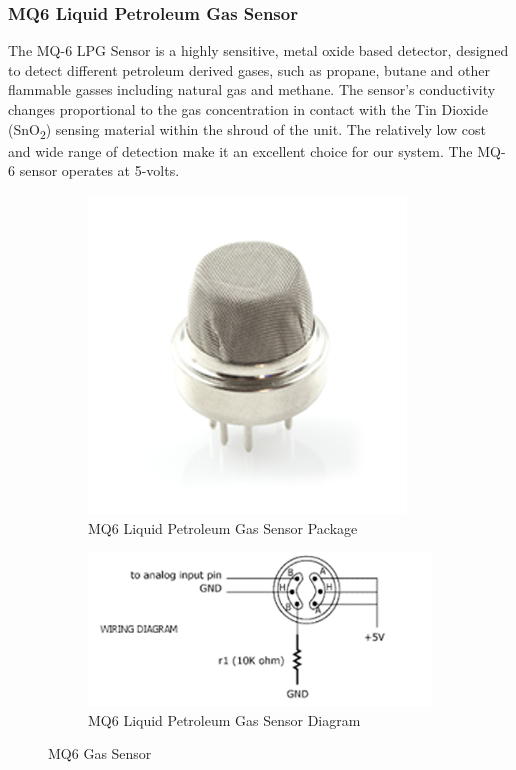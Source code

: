 \subsubsection{MQ6 Liquid Petroleum Gas Sensor}
\par The MQ-6 LPG Sensor is a highly sensitive, metal oxide based detector, designed to detect different petroleum derived gases, such as propane, butane and other flammable gasses including natural gas and methane. The sensor's conductivity changes proportional to the gas concentration in contact with the Tin Dioxide (SnO\textsubscript{2}) sensing material within the shroud of the unit. The relatively low cost and wide range of detection make it an excellent choice for our system. The MQ-6 sensor operates at 5-volts.
\begin{figure}[h!]
	\centering
	\begin{subfigure}[t]{0.22\textwidth}
		\centering
		\includegraphics[width=.8\textwidth]{mq6.png}
		\caption{MQ6 Liquid Petroleum Gas Sensor Package}
	\end{subfigure}
	\begin{subfigure}[t]{0.22\textwidth}
		\centering
		\includegraphics[width=\textwidth]{mq6diag.png}
		\caption{MQ6 Liquid Petroleum Gas Sensor Diagram}
	\end{subfigure}
	\caption{MQ6 Gas Sensor}
\end{figure}
